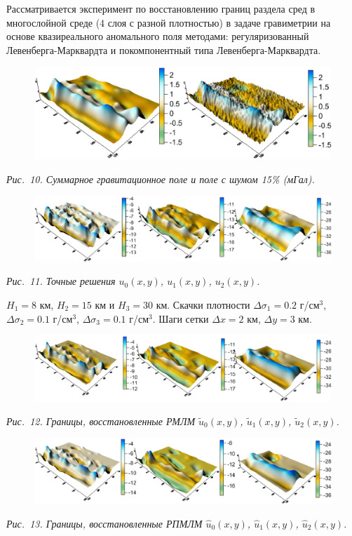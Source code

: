 \documentclass[10pt,pdf, mathserif, hyperref={unicode}]{beamer}
\begin{document}
\begin{frame}
	Рассматривается эксперимент по восстановлению границ раздела сред в многослойной среде (4 слоя с разной плотностью) в задаче гравиметрии на основе квазиреального аномального поля методами: регуляризованный Левенберга-Марквардта и покомпонентный типа Левенберга-Марквардта.
	\begin{figure}
		\centering
		\includegraphics[height=0.3\textheight]{fields}
	\end{figure}
	\centering\textit{Рис.~10. Суммарное гравитационное поле и поле с шумом 15\% (мГал).}
	\begin{figure}
		\centering
		\includegraphics[height=0.2\textheight]{exact_hor}
	\end{figure}
	\centering\textit{Рис.~11. Точные решения $u_0(x,y)$, $u_1(x,y)$, $u_2(x,y)$.}
	
	$H_1=8$ км, $H_2=15$ км и $H_3=30$ км. Скачки плотности $\Delta\sigma_1=0.2$ г/см$^3$, $\Delta\sigma_2=0.1$ г/см$^3$, $\Delta\sigma_3=0.1$ г/см$^3$. Шаги сетки $\Delta x=2$ км, $\Delta y=3$ км.
\end{frame}
\begin{frame}
	\begin{figure}
		\centering
		\includegraphics[height=0.2\textheight]{levmar}
	\end{figure}
	\centering\textit{Рис.~12. Границы, восстановленные РМЛМ $\tilde{u}_0(x,y)$, $\tilde{u}_1(x,y)$, $\tilde{u}_2(x,y)$.}
	\begin{figure}
		\centering
		\includegraphics[height=0.2\textheight]{clm}
	\end{figure}
	\centering\textit{Рис.~13. Границы, восстановленные РПМЛМ $\hat{u}_0(x,y)$, $\hat{u}_1(x,y)$, $\hat{u}_2(x,y)$.}
\end{frame}
\end{document}
